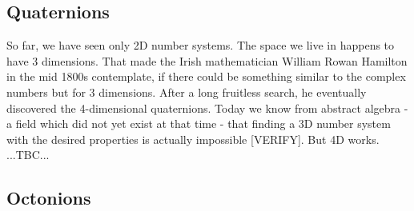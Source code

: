 










\subsection{Quaternions}
So far, we have seen only 2D number systems. The space we live in happens to have 3 dimensions. That made the Irish mathematician William Rowan Hamilton in the mid 1800s contemplate, if there could be something similar to the complex numbers but for 3 dimensions. After a long fruitless search, he eventually discovered the 4-dimensional quaternions. Today we know from abstract algebra - a field which did not yet exist at that time - that finding a 3D number system with the desired properties is actually impossible [VERIFY]. But 4D works. ...TBC...





\subsection{Octonions}

